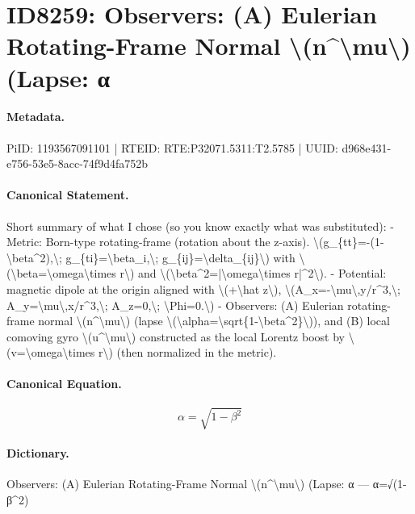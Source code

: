 \section*{ID8259: Observers: (A) Eulerian Rotating-Frame Normal \textbackslash{}(n\textasciicircum{}\textbackslash{}mu\textbackslash{}) (Lapse: α}
\paragraph{Metadata.}
PiID: 1193567091101 | RTEID: RTE:P32071.5311:T2.5785 | UUID: d968e431-e756-53e5-8acc-74f9d4fa752b

\paragraph{Canonical Statement.}
Short summary of what I chose (so you know exactly what was substituted): - Metric: Born-type rotating-frame (rotation about the z-axis). \textbackslash{}(g\_\{tt\}=-(1-\textbackslash{}beta\textasciicircum{}2),\textbackslash{}; g\_\{ti\}=\textbackslash{}beta\_i,\textbackslash{}; g\_\{ij\}=\textbackslash{}delta\_\{ij\}\textbackslash{}) with \textbackslash{}(\textbackslash{}beta=\textbackslash{}omega\textbackslash{}times r\textbackslash{}) and \textbackslash{}(\textbackslash{}beta\textasciicircum{}2=|\textbackslash{}omega\textbackslash{}times r|\textasciicircum{}2\textbackslash{}). - Potential: magnetic dipole at the origin aligned with \textbackslash{}(+\textbackslash{}hat z\textbackslash{}), \textbackslash{}(A\_x=-\textbackslash{}mu\textbackslash{},y/r\textasciicircum{}3,\textbackslash{}; A\_y=\textbackslash{}mu\textbackslash{},x/r\textasciicircum{}3,\textbackslash{}; A\_z=0,\textbackslash{}; \textbackslash{}Phi=0.\textbackslash{}) - Observers: (A) Eulerian rotating-frame normal \textbackslash{}(n\textasciicircum{}\textbackslash{}mu\textbackslash{}) (lapse \textbackslash{}(\textbackslash{}alpha=\textbackslash{}sqrt\{1-\textbackslash{}beta\textasciicircum{}2\}\textbackslash{})), and (B) local comoving gyro \textbackslash{}(u\textasciicircum{}\textbackslash{}mu\textbackslash{}) constructed as the local Lorentz boost by \textbackslash{}(v=\textbackslash{}omega\textbackslash{}times r\textbackslash{}) (then normalized in the metric).

\paragraph{Canonical Equation.}
\[
\alpha=\sqrt{1-\beta^2}
\]

\paragraph{Dictionary.}
Observers: (A) Eulerian Rotating-Frame Normal \textbackslash{}(n\textasciicircum{}\textbackslash{}mu\textbackslash{}) (Lapse: α — α=√(1-β\textasciicircum{}2)

